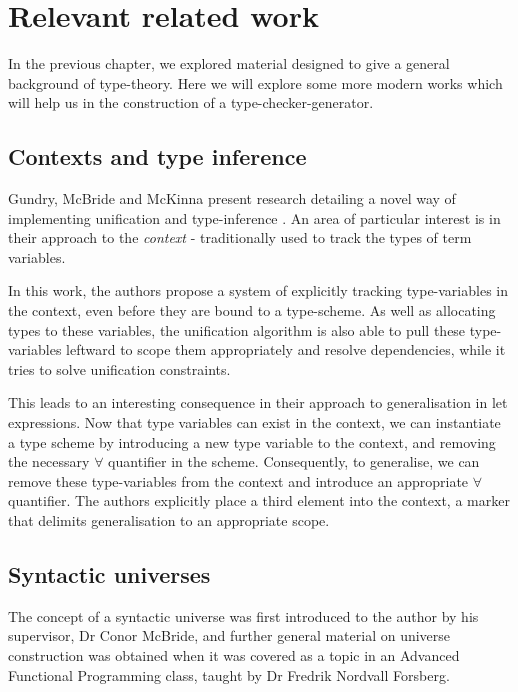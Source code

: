\chapter{Relevant related work}

In the previous chapter, we explored material designed to give a
general background of type-theory. Here we will explore some more
modern works which will help us in the construction of a
type-checker-generator.

\section{Contexts and type inference}

Gundry, McBride and McKinna present research detailing a
novel way of implementing unification and
type-inference \cite{TypeInferenceInContext}. An area of
particular interest is in their approach to the
\emph{context} - traditionally used to track the types of
term variables.

In this work, the authors propose a system of explicitly
tracking type-variables in the context, even before they are
bound to a type-scheme. As well as allocating types
to these variables, the unification algorithm is also
able to pull these type-variables leftward to scope them
appropriately and resolve dependencies, while it tries to
solve unification constraints.

This leads to an interesting consequence in their approach to
generalisation in let expressions. Now that type variables
can exist in the context, we can instantiate a type
scheme by introducing a new type variable to the context,
and removing the necessary $\forall$ quantifier in the
scheme. Consequently, to generalise, we can remove these
type-variables from the context and introduce an
appropriate $\forall$ quantifier. The authors explicitly
place a third element into the context, a marker that delimits
generalisation to an appropriate scope.

\section{Syntactic universes}

The concept of a syntactic universe was first introduced to the author
by his supervisor, Dr Conor McBride, and further general
material on universe construction was obtained when it was covered
as a topic in an Advanced Functional Programming class, taught
by Dr Fredrik Nordvall Forsberg.

